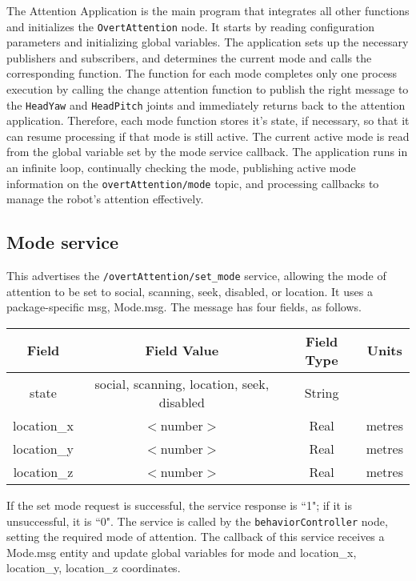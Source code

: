 \documentclass{CSSRforAfrica}
\begin{document}
The Attention Application is the main program that integrates all other functions and initializes the \texttt{OvertAttention} node. It starts by reading configuration parameters and initializing global variables. The application sets up the necessary publishers and subscribers, and determines the current mode and calls the corresponding function. The function for each mode completes only one process execution by calling the change attention function to publish the right message to the \texttt{HeadYaw} and \texttt{HeadPitch} joints and immediately returns back to the attention application. Therefore, each mode function stores it's state, if necessary, so that it can resume processing if that mode is still active. The current active mode is read from the global variable set by the mode service callback. The application runs in an infinite loop, continually checking the mode, publishing active mode information on the \texttt{overtAttention/mode} topic, and processing callbacks to manage the robot's attention effectively.

\subsection{Mode service}

This advertises the \texttt{/overtAttention/set\_mode} service, allowing the mode of attention to be set to social, scanning, seek, disabled, or location. It uses a package-specific msg, Mode.msg. The
message has four fields, as follows.

\begin{center}
	\begin{tabular}{ |c|c|c|c| } 
		\hline
		Field & Field Value & Field Type & Units \\  
		\hline
		state & social, scanning, location, seek, disabled & String & \\  
		\hline
		location\_x & $<$number$>$ & Real & metres \\  
		\hline
		location\_y & $<$number$>$ & Real & metres \\ 
		\hline 
		location\_z & $<$number$>$ & Real & metres \\ 
		\hline
	\end{tabular}
\end{center}
If the set mode request is successful, the service response is ``1"; if it is unsuccessful, it is ``0". The service is called by the \texttt{behaviorController} node, setting the required mode of attention. The callback of this service receives a Mode.msg entity and update global variables for mode and location\_x, location\_y, location\_z coordinates.
\end{document}
